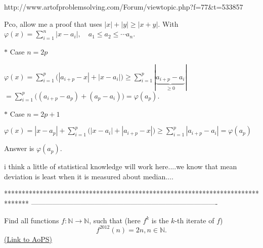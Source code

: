 \begin{solution}
	http://www.artofproblemsolving.com/Forum/viewtopic.php?f=77&t=533857
\end{solution}



\begin{solution}
	Pco, allow me a proof that uses $|x|+|y|\ge|x+y|$.
With $\varphi(x)=\sum_{i=1}^n |x-a_i|, \quad a_1\le a_2\le \cdots a_n$.

\begin{bolded}$\ast$   Case $n=2p$\end{bolded}
$\varphi(x)=\sum_{i=1}^p \big(|a_{i+p}-x|+|x-a_i|\big) \ge \sum_{i=1}^p |\underbrace{a_{i+p}-a_i}_{\ge 0}|$
$= \sum_{i=1}^p \big((a_{i+p}-a_p)+(a_p-a_i) \big)=\varphi(a_p)$.

\begin{bolded}$\ast$ Case $n=2p+1$\end{bolded}
$\varphi(x)=|x-a_p|+\sum_{i=1}^p \big(|x-a_i|+|a_{i+p}-x|\big)\ge \sum_{i=1}^p |a_{i+p}-a_i|= \varphi(a_p)$

Answer is $\varphi(a_p)$.
\end{solution}



\begin{solution}
	i think a little of statistical knowledge will work here....we know that mean deviation is least when it is measured about median....
\end{solution}
*******************************************************************************
-------------------------------------------------------------------------------

\begin{problem}
	Find all functions  $f: \mathbb{N} \to \mathbb{N}$, such that (here $f^k$ is the $k$-th iterate of $f$)
\[ f^{2012}(n)=2n,    n\in \mathbb{N}.  \]
	\flushright \href{https://artofproblemsolving.com/community/c6h534916}{(Link to AoPS)}
\end{problem}



